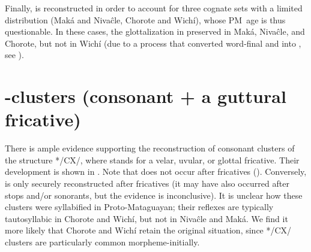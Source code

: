 \begin{exe}
    \ex \pronominal
    \ex \grabwork
    \ex \thorncutjan
    \ex {}
    \ex \up \label{'m-up}
    \ex \kingvulture \label{'n-kingvulture}
    \ex \throwv
    \ex \meat
\end{exe}

Finally,  is reconstructed in order to account for three cognate sets with a limited distribution (Maká and Nivaĉle, Chorote and Wichí), whose PM~age is thus questionable. In these cases, the glottalization in preserved in Maká, Nivaĉle, and Chorote, but not in Wichí (due to a process that converted word-final  and  into , see ).

\begin{exe}
    \ex \brightness
    \ex \locustcw
    \ex \agile
\end{exe}

\section{-clusters (consonant + a guttural fricative)}\label{cx}
There is ample evidence supporting the reconstruction of consonant clusters of the structure */CX/, where  stands for a velar, uvular, or glottal fricative. Their development is shown in . Note that  does not occur after fricatives (). Conversely,  is only securely reconstructed after fricatives (it may have also occurred after stops and/or sonorants, but the evidence is inconclusive). It is unclear how these clusters were syllabified in Proto-Mataguayan; their reflexes are typically tautosyllabic in Chorote and Wichí, but not in Nivaĉle and Maká. We find it more likely that Chorote and Wichí retain the original situation, since */CX/ clusters are particularly common morpheme-initially.

\begin{table}
\caption{PM clusters with a guttural fricative as the second element}
\label{PM-CX}
\end{table}

